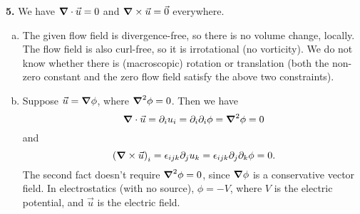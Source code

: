 \documentclass[11pt]{article}
\newcommand{\p}{\partial}%
\begin{document}
\noindent \textbf{5.} We have $\grad\cdot  \vec{u} = 0$ and $\grad \times \vec{u} = \vec{0}$ everywhere. 
\begin{enumerate}[(a)]
	\item The given flow field is divergence-free, so there is no volume change, locally. The flow field is also curl-free, so it is irrotational (no vorticity). We do not know whether there is (macroscopic) rotation or translation (both the non-zero constant and the zero flow field satisfy the above two constraints). 
	
	\item Suppose $\vec{u} = \grad \phi$, where $\grad^2 \phi =0$. Then we have
	\begin{equation*}
	\grad \cdot \vec{u} = \p_i u_i = \p_i \p_i \phi = \grad^2 \phi = 0
	\end{equation*}
	and
	\begin{equation*}
	\left(\grad \times \vec{u}\right)_i = \epsilon_{ijk}\p_j u_k = \epsilon_{ijk}\p_j \p_k \phi = 0.
	\end{equation*}
	The second fact doesn't require $\grad^2 \phi = 0$, since $\grad \phi$ is a conservative vector field. In electrostatics (with no source), $\phi = -V$, where $V$ is the electric potential, and $\vec{u}$ is the electric field. 
\end{enumerate}
  
\end{document}
